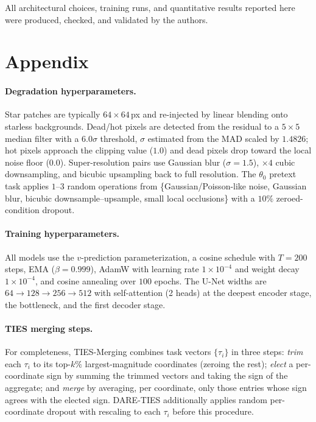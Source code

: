 \documentclass{article}
\begin{document}
All architectural choices, training runs, and quantitative results reported here were produced, checked, and validated by the authors.




\section*{Appendix}

\paragraph*{Degradation hyperparameters.} Star patches are typically $64\times64$\,px and re-injected by linear blending onto starless backgrounds. Dead/hot pixels are detected from the residual to a $5\times5$ median filter with a $6.0\sigma$ threshold, $\sigma$ estimated from the MAD scaled by $1.4826$; hot pixels approach the clipping value ($1.0$) and dead pixels drop toward the local noise floor ($0.0$). Super-resolution pairs use Gaussian blur ($\sigma=1.5$), $\times4$ cubic downsampling, and bicubic upsampling back to full resolution. The $\theta_0$ pretext task applies $1$--$3$ random operations from \{Gaussian/Poisson-like noise, Gaussian blur, bicubic downsample--upsample, small local occlusions\} with a $10\%$ zeroed-condition dropout.

\paragraph*{Training hyperparameters.} All models use the $v$-prediction parameterization, a cosine schedule with $T=200$ steps, EMA ($\beta=0.999$), AdamW with learning rate $1\times10^{-4}$ and weight decay $1\times10^{-4}$, and cosine annealing over $100$ epochs. The U-Net widths are $64\!\to\!128\!\to\!256\!\to\!512$ with self-attention (2 heads) at the deepest encoder stage, the bottleneck, and the first decoder stage.

\paragraph*{TIES merging steps.} For completeness, TIES-Merging combines task vectors $\{\tau_i\}$ in three steps: \emph{trim} each $\tau_i$ to its top-$k\%$ largest-magnitude coordinates (zeroing the rest); \emph{elect} a per-coordinate sign by summing the trimmed vectors and taking the sign of the aggregate; and \emph{merge} by averaging, per coordinate, only those entries whose sign agrees with the elected sign. DARE-TIES additionally applies random per-coordinate dropout with rescaling to each $\tau_i$ before this procedure.
\end{document}
